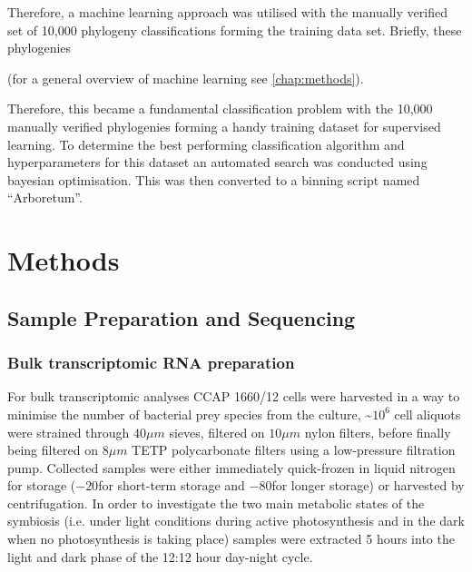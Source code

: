 Therefore, a machine learning approach was utilised with the manually verified set of 10,000 phylogeny
classifications forming the training data set. Briefly, these phylogenies 



(for a general overview of machine learning see
\ref{chap:methods}).




Therefore, this became a fundamental classification problem with the 10,000 manually verified phylogenies
forming a handy training dataset for supervised learning.   To determine the best performing
classification algorithm and hyperparameters for this dataset an automated search was conducted 
using bayesian optimisation.  This was then converted to a binning script named ``Arboretum''.



%
%
\section{Methods} 

\subsection{Sample Preparation and Sequencing}

\subsubsection{Bulk transcriptomic RNA preparation}
For bulk transcriptomic analyses CCAP 1660/12 cells were harvested in a way to minimise the 
number of bacterial prey species from the culture, \textasciitilde \(10^{6}\) 
cell aliquots were strained through \(40\mu m\) sieves, filtered on 
\(10 \mu m\) nylon filters, 
before finally being filtered on \(8 \mu m\) TETP polycarbonate filters using a 
low-pressure filtration pump.  Collected samples were either immediately 
quick-frozen in liquid nitrogen for storage (\(-20\)\celsius for short-term storage 
and \(-80\)\celsius for longer storage) or harvested by centrifugation.  
In order to investigate the two main metabolic states of the symbiosis 
(i.e. under light conditions during active photosynthesis and in the dark 
when no photosynthesis is taking place) samples were extracted 5 hours into 
the light and dark phase of the 12:12 hour day-night cycle.

